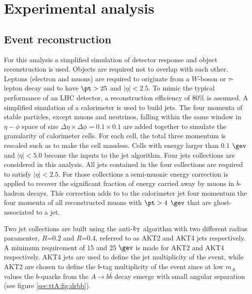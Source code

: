 \section{Experimental analysis}
  
\subsection{Event reconstruction}

For this analysis a simplified simulation of detector response and  object reconstruction is used. Objects are required not to overlap with each other.
Leptons (electron and muons) are required to originate from a $W$-boson or $\tau$-lepton decay and to have $\pt >25$ \gev and $|\eta|<2.5$. To mimic the typical performance of an LHC detector, a reconstruction efficiency of $80\%$ is assumed. A simplified simulation of a calorimeter is used to build jets.  The four momenta of stable particles, except muons and neutrinos, falling within the same window in $\eta-\phi$ space of size $\Delta \eta \times \Delta \phi = 0.1 \times 0.1$ are added together to simulate the granularity of calorimeter cells.  For each cell, the total three momentum is rescaled such as to make the cell massless.  Cells with energy larger than 0.1 $\gev$ and $|\eta|<5.0$ become the inputs to the jet algorithm. Four jets collections are considered in this analysis. All jets contained in the four collections are required to satisfy $|\eta|<2.5$. For those collections a semi-muonic energy correction is applied to recover the significant fraction of energy carried away by muons in $b$-hadron decays. This correction adds to to the calorimeter jet four momentum the four momenta of all reconstructed muons with $\pt>4$ $\gev$ that are ghost-associated to a jet. \par Two jet collections are built using the anti-$k_{\rm T}$ algorithm with two different radius paramenter, $R$=0.2 and $R$=0.4, referred to as AKT2 and AKT4 jets respectively.
A minimum \pt requirement of 15 and 25 $\gev$ is made for AKT2 and AKT4 respectively. AKT4 jets are used to define the jet multiplicity of the event, while AKT2 are chosen to define the $b$-tag multiplicity of the event since at low $m_{A}$ values the $b$-quarks from the $A\to b \bar{b}$ decay emerge with small angular separation (see figure \ref{sec:ttA:fig:drbb}).
